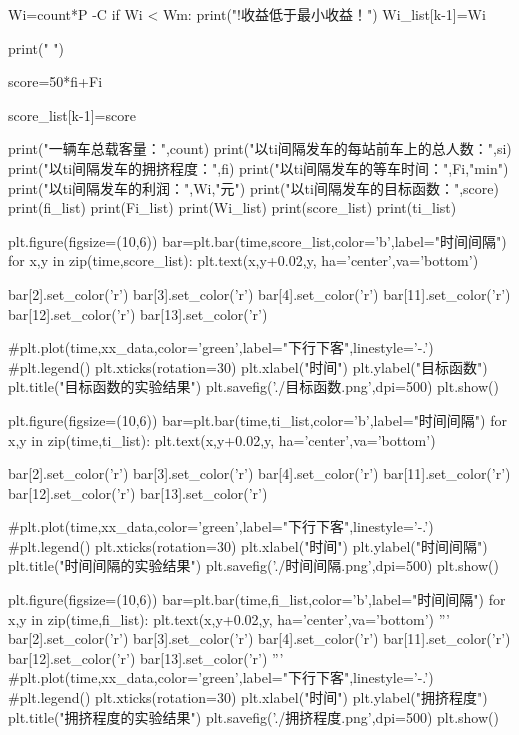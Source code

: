 \documentclass[UTF8]{ctexart}
\begin{document}
\begin{python}
		Wi=count*P -C
		if Wi < Wm:
		print("!收益低于最小收益！")
		Wi_list[k-1]=Wi
		
		print(" ")
		
		score=50*fi+Fi
		
		score_list[k-1]=score
		
		print("一辆车总载客量：",count)
		print("以ti间隔发车的每站前车上的总人数：",si)
		print("以ti间隔发车的拥挤程度：",fi)
		print("以ti间隔发车的等车时间：",Fi,"min")
		print("以ti间隔发车的利润：",Wi,"元")
		print("以ti间隔发车的目标函数：",score)
		print(fi_list)
		print(Fi_list)
		print(Wi_list)
		print(score_list)
		print(ti_list)
		
		plt.figure(figsize=(10,6))
		bar=plt.bar(time,score_list,color='b',label="时间间隔")
		for x,y in zip(time,score_list):
		plt.text(x,y+0.02,y, ha='center',va='bottom')
		
		bar[2].set_color('r')
		bar[3].set_color('r')
		bar[4].set_color('r')
		bar[11].set_color('r')
		bar[12].set_color('r')
		bar[13].set_color('r')
		
		#plt.plot(time,xx_data,color='green',label="下行下客",linestyle='-.')
		#plt.legend()
		plt.xticks(rotation=30)
		plt.xlabel("时间")
		plt.ylabel("目标函数")
		plt.title("目标函数的实验结果")
		plt.savefig('./目标函数.png',dpi=500)
		plt.show()
		
		plt.figure(figsize=(10,6))
		bar=plt.bar(time,ti_list,color='b',label="时间间隔")
		for x,y in zip(time,ti_list):
		plt.text(x,y+0.02,y, ha='center',va='bottom')
		
		bar[2].set_color('r')
		bar[3].set_color('r')
		bar[4].set_color('r')
		bar[11].set_color('r')
		bar[12].set_color('r')
		bar[13].set_color('r')
		
		#plt.plot(time,xx_data,color='green',label="下行下客",linestyle='-.')
		#plt.legend()
		plt.xticks(rotation=30)
		plt.xlabel("时间")
		plt.ylabel("时间间隔")
		plt.title("时间间隔的实验结果")
		plt.savefig('./时间间隔.png',dpi=500)
		plt.show()
		
		plt.figure(figsize=(10,6))
		bar=plt.bar(time,fi_list,color='b',label="时间间隔")
		for x,y in zip(time,fi_list):
		plt.text(x,y+0.02,y, ha='center',va='bottom')
		'''
		bar[2].set_color('r')
		bar[3].set_color('r')
		bar[4].set_color('r')
		bar[11].set_color('r')
		bar[12].set_color('r')
		bar[13].set_color('r')
		'''
		#plt.plot(time,xx_data,color='green',label="下行下客",linestyle='-.')
		#plt.legend()
		plt.xticks(rotation=30)
		plt.xlabel("时间")
		plt.ylabel("拥挤程度")
		plt.title("拥挤程度的实验结果")
		plt.savefig('./拥挤程度.png',dpi=500)
		plt.show()
		

\end{python}
\end{document}
